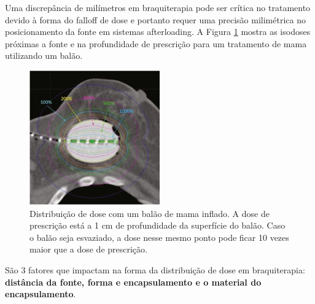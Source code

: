 \documentclass[11pt,a4paper]{article}
\begin{document}
		Uma discrepância de milímetros em braquiterapia pode ser crítica no tratamento devido à forma do falloff de dose e portanto requer uma precisão milimétrica no posicionamento da fonte em sistemas afterloading. A Figura \ref{img:DistribuicaoDoseBalao} mostra as isodoses próximas a fonte e na profundidade de prescrição para um tratamento de mama utilizando um balão.

		\begin{figure}[h]
			\centering
			\includegraphics[width=0.5\textwidth]{Imagens/falloffDoseMammosite.JPG}
			\caption{Distribuição de dose com um balão de mama inflado. A dose de prescrição está a 1 cm de profundidade da superfície do balão. Caso o balão seja esvaziado, a dose nesse mesmo ponto pode ficar 10 vezes maior que a dose de prescrição.}
			\label{img:DistribuicaoDoseBalao}
		\end{figure}

		São 3 fatores que impactam na forma da distribuição de dose em braquiterapia: \textbf{\textcolor{CarnationPink}{distância da fonte, forma e encapsulamento e o material do encapsulamento}}.
\end{document}

